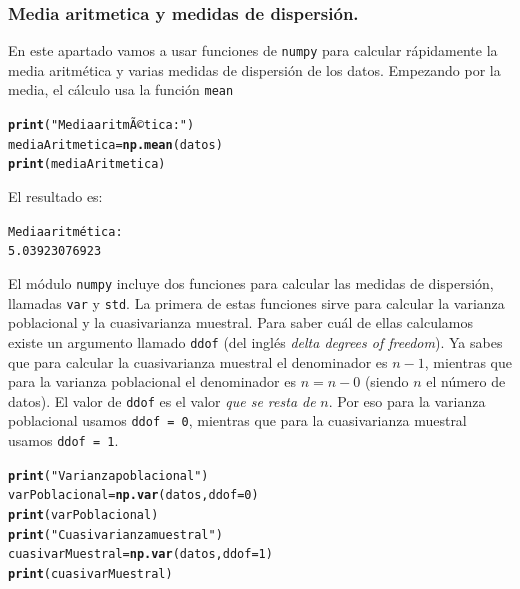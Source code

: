 \documentclass[10pt,a4paper]{article}\usepackage[]{graphicx}\usepackage[]{color}
\makeatletter
\newcommand{\hlnum}[1]{\textcolor[rgb]{0.686,0.059,0.569}{#1}}%
\newcommand{\hlstr}[1]{\textcolor[rgb]{0.192,0.494,0.8}{#1}}%
\newcommand{\hlstd}[1]{\textcolor[rgb]{0.345,0.345,0.345}{#1}}%
\newcommand{\hlkwb}[1]{\textcolor[rgb]{0.69,0.353,0.396}{#1}}%
\newcommand{\hlkwc}[1]{\textcolor[rgb]{0.333,0.667,0.333}{#1}}%
\newcommand{\hlkwd}[1]{\textcolor[rgb]{0.737,0.353,0.396}{\textbf{#1}}}%
\newenvironment{kframe}{%
 \def\at@end@of@kframe{}%
 \ifinner\ifhmode%
  \def\at@end@of@kframe{\end{minipage}}%
  \begin{minipage}{\columnwidth}%
 \fi\fi%
 \def\FrameCommand##1{\hskip\@totalleftmargin \hskip-\fboxsep
 \colorbox{shadecolor}{##1}\hskip-\fboxsep
     \hskip-\linewidth \hskip-\@totalleftmargin \hskip\columnwidth}%
 \MakeFramed {\advance\hsize-\width
   \@totalleftmargin\z@ \linewidth\hsize
   \@setminipage}}%
 {\par\unskip\endMakeFramed%
 \at@end@of@kframe}
\newenvironment{knitrout}{}{} %
\makeatother
\begin{document}
\subsubsection*{Media aritmetica y medidas de dispersión.}
\label{tut02:subsubsec:mediaAritmeticaDispersion}



En este apartado vamos a usar funciones de {\tt numpy} para calcular rápidamente la media aritmética y varias medidas de dispersión de los datos. Empezando por la media, el cálculo usa la función {\tt mean}
\begin{knitrout}
\color{fgcolor}\begin{kframe}
\begin{alltt}
\hlkwd{print}\hlstd{(}\hlstr{"Media aritmÃ©tica:"}\hlstd{)}
\hlstd{mediaAritmetica} \hlkwb{=} \hlkwd{np.mean}\hlstd{(datos)}
\hlkwd{print}\hlstd{(mediaAritmetica)}
\end{alltt}
\end{kframe}
\end{knitrout}
El resultado es:
\begin{knitrout}
\color{fgcolor}\begin{kframe}
\begin{alltt}
Media aritmética:
5.03923076923
\end{alltt}
\end{kframe}
\end{knitrout}
El módulo {\tt numpy} incluye dos funciones para calcular las medidas de dispersión, llamadas {\tt var} y {\tt std}. La primera de estas funciones sirve para calcular la varianza poblacional y la cuasivarianza muestral. Para saber cuál de ellas calculamos existe un argumento llamado {\tt ddof} (del inglés {\em delta degrees of freedom}). Ya sabes que para calcular la cuasivarianza muestral el denominador es $n - 1$, mientras que para la varianza poblacional el denominador es $n = n - 0$ (siendo $n$ el número de datos). El valor de {\tt ddof} es el valor {\em que se resta de} $n$. Por eso para la varianza poblacional usamos {\tt ddof = 0}, mientras que para la cuasivarianza muestral usamos {\tt ddof = 1}.
\begin{knitrout}
\color{fgcolor}\begin{kframe}
\begin{alltt}
\hlkwd{print}\hlstd{(}\hlstr{"Varianza poblacional"}\hlstd{)}
\hlstd{varPoblacional} \hlkwb{=} \hlkwd{np.var}\hlstd{(datos,} \hlkwc{ddof}\hlstd{=}\hlnum{0}\hlstd{)}
\hlkwd{print}\hlstd{(varPoblacional)}
\hlkwd{print}\hlstd{(}\hlstr{"Cuasivarianza muestral"}\hlstd{)}
\hlstd{cuasivarMuestral} \hlkwb{=} \hlkwd{np.var}\hlstd{(datos,} \hlkwc{ddof}\hlstd{=}\hlnum{1}\hlstd{)}
\hlkwd{print}\hlstd{(cuasivarMuestral)}
\end{alltt}
\end{kframe}
\end{knitrout}
\end{document}
